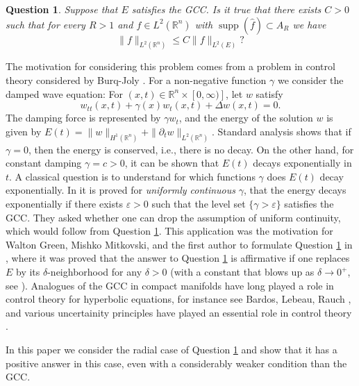 \documentclass[11pt,a4paper,reqno,dvipsnames]{amsart}
\newcommand{\supp}{\operatorname{supp}}
\newcommand{\ep}{\varepsilon}
\newcommand{\R}{\mathbb R}
\newcommand{\wh}{\widehat}
\renewcommand{\ge}{\geqslant}
\numberwithin{equation}{section}
\theoremstyle{plain}
\newtheorem{question}{Question}
\theoremstyle{definition}
\theoremstyle{remark}
\begin{document}
\begin{question}\label{gccques} Suppose that $E$ satisfies the GCC.  Is it true that there exists $C>0$ such that for every $R>1$ and $f\in L^2(\R^n)$ with $\supp(\wh{f})\subset A_R$ we have
$$\|f\|_{L^2(\R^n)}\leq C\|f\|_{L^2(E)}?
$$ \end{question}

The motivation for considering this problem comes from a problem in control theory considered by Burq-Joly \cite{burq16}.  For a non-negative function $\gamma$ we consider the damped wave equation: For $(x,t) \in \R^n \times [0,\infty)]$, let $w$ satisfy
 	\begin{equation}\label{eq:1} w_{tt}(x,t) +\gamma(x)w_t(x,t) + \Delta w(x,t)=0.\end{equation}
The damping force is represented by $\gamma w_t$, and the energy of the solution $w$ is given by $E(t) = \|w\|_{H^1(\R^n)}+\|\partial_t w\|_{L^2(\R^n)}$.
Standard analysis shows that if $\gamma=0$, then the energy is conserved, i.e., there is no decay. On the other hand, for constant damping $\gamma=c >0$, it can be shown that $E(t)$ decays exponentially in $t$.  A classical question is to understand for which functions $\gamma$ does $E(t)$ decay exponentially. In \cite{burq16} it is proved for \emph{uniformly continuous} $\gamma$, that the energy decays exponentially if there exists $\ep>0$ such that the level set $\{\gamma>\ep\}$ satisfies the GCC.  They asked whether one can drop the assumption of uniform continuity, which would follow from Question \ref{gccques}.  This application was the motivation for Walton Green, Mishko Mitkovski, and the first author to formulate Question \ref{gccques} in \cite{green-jaye-mitkovski}, where it was proved that the answer to Question \ref{gccques} is affirmative if one replaces $E$ by its $\delta$-neighborhood for any $\delta>0$ (with a constant that blows up as $\delta\to 0^+$, see \cite{green-jaye-mitkovski}).  Analogues of the GCC in compact manifolds have long played a role in  control theory for hyperbolic equations, for instance see Bardos, Lebeau, Rauch \cite{b-l-r, zworski-book}, and various uncertainity principles have played an essential role in control theory \cite{bourgain18,jaffard01,zworski-book,suzuki-inami,suzuki-damping}.

In this paper we consider the radial case of Question \ref{gccques} and show that it has a positive answer in this case, even with a considerably weaker condition than the GCC. 
\end{document}
